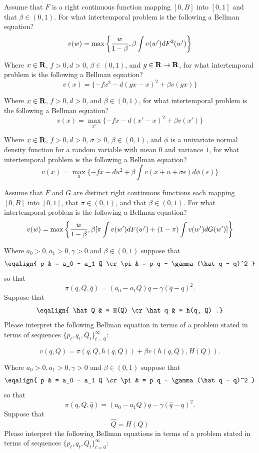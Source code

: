   Assume that  $F$ is a right continuous function mapping $[0, B]$ into $[0,1]$ and that $\beta \in (0,1)$. For what intertemporal problem is the following a Bellman equation?
$$ v(w) = \max\left\{ {w\over{1-\beta}},  \beta \int v(w') d F^2(w') \right\} $$



\medskip
{} Where $x \in {\bf R}$, $f >0, d >0 $,   $\beta \in (0,1)$, and $g \in  {\bf R} \rightarrow {\bf R}$, for what intertemporal problem is the following  a Bellman equation?
$$ v(x) =  \{- f x^2 - d(gx  - x)^2 + \beta v(gx) \} $$


\medskip
{}   Where $x \in {\bf R}$, $f >0, d >0 $, and   $\beta \in (0,1)$, for what intertemporal problem is the following  a Bellman equation?
$$ v(x) = \max_{x'} \{ - f x - d(x' - x)^2 + \beta v(x') \} $$


\medskip
{} Where $x \in {\bf R}$, $f >0, d >0 $, $\sigma >0$,    $\beta \in (0,1)$, and $\phi$ is a univariate normal density function for a random
variable with mean $0$ and variance $1$, for what intertemporal problem is the following  a Bellman equation?
$$ v(x) = \max_{u} \{ - f x - d u^2 + \beta \int v(x +u + \sigma \epsilon) d \phi(\epsilon) \} $$



\medskip



  Assume that  $F$ and $G$ are distinct  right continuous functions each mapping $[0, B]$ into $[0,1]$, that $\pi \in (0,1)$, and  that $\beta \in (0,1)$. For what intertemporal problem is the following a Bellman equation?
$$ v(w) = \max\left\{ {w\over{1-\beta}},  \beta [  \pi \int v(w') d F(w') + (1-\pi) \int v(w') d G(w') ]  \right\} $$


\medskip

 Where $a_0 >0, a_1> 0, \gamma > 0$ and $\beta \in (0,1)$ suppose that
$$\eqalign{ p & = a_0 - a_1 Q \cr
           \pi &  = p q - \gamma(\hat q - q)^2 } $$
so that
$$ \pi(q, Q, \hat q) = (a_0 - a_1 Q)  q - \gamma (\hat q - q)^2 .$$
Suppose that
$$ \eqalign{ \hat Q & = H(Q) \cr
            \hat q & = h(q, Q) .} $$
Please interpret the following Bellman equation in terms of a problem stated in terms of sequences  $\{p_t, q_t, Q_t\}_{t=0}^\infty$:

$$ v(q, Q) = \pi(q,Q, h(q,Q)) + \beta v\left(h(q,Q), H(Q)\right) .$$

\medskip


 Where $a_0 >0, a_1> 0, \gamma > 0$ and $\beta \in (0,1)$ suppose that
$$\eqalign{ p & = a_0 - a_1 Q \cr
           \pi &  = p q - \gamma(\hat q - q)^2 } $$
so that
$$ \pi(q, Q, \hat q) = (a_0 - a_1 Q) q - \gamma (\hat q - q)^2 .$$
Suppose that
$$ \hat Q  = H(Q)  $$
Please interpret the following Bellman equations in terms of a problem stated in terms of sequences  $\{p_t, q_t, Q_t\}_{t=0}^\infty$:


